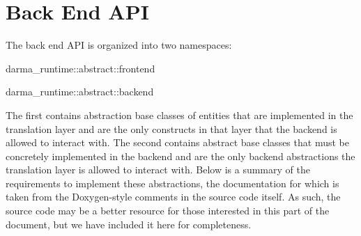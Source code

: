 
\chapter{Back End API}
\label{chap:back_end}

The back end API is organized into two namespaces:
\begin{compactenum}
\item {\ttfamily darma\_runtime::abstract::frontend} 
\item {\ttfamily darma\_runtime::abstract::backend}  
\end{compactenum}

The first contains
abstraction base classes of entities that are implemented in the translation
layer and are the only constructs in that layer that the backend is
allowed to interact with.  The second contains abstract base classes that must be concretely implemented in the backend and
are the only backend abstractions the translation layer is allowed to interact
with.  Below is a summary of the requirements to implement these abstractions,
the documentation for which is taken from the Doxygen-style comments in
the source code itself.  As such, the source code may be a better resource for
those interested in this part of the document, but we have included it here for
completeness.  

